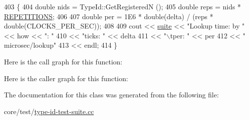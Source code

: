 \begin{DoxyCode}
403 \{
404   \textcolor{keywordtype}{double} nids = TypeId::GetRegisteredN ();
405   \textcolor{keywordtype}{double} reps = nids * \hyperlink{classLookupTimeTestCase_a3b615426fb6225fbfe0f6820045c9cc4a907138b831d97cac6261e5dfada683eb}{REPETITIONS};
406   
407   \textcolor{keywordtype}{double} per = 1E6 * double(delta) / (reps * double(CLOCKS\_PER\_SEC));
408   
409   cout << \hyperlink{type-id-test-suite_8cc_ab4acb0fe33ca0947f675eed6196ed8ca}{suite} << \textcolor{stringliteral}{"Lookup time: by "} << how << \textcolor{stringliteral}{": "}
410        << \textcolor{stringliteral}{"ticks: "} << delta
411        << \textcolor{stringliteral}{"\(\backslash\)tper: "}   << per
412        << \textcolor{stringliteral}{" microsec/lookup"}
413        << endl;                                 
414 \}
\end{DoxyCode}


Here is the call graph for this function\+:




Here is the caller graph for this function\+:




The documentation for this class was generated from the following file\+:\begin{DoxyCompactItemize}
\item 
core/test/\hyperlink{type-id-test-suite_8cc}{type-\/id-\/test-\/suite.\+cc}\end{DoxyCompactItemize}
